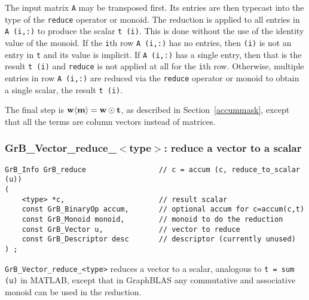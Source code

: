 \documentclass[12pt]{article}
\begin{document}
The input matrix \verb'A' may be transposed first.  Its entries are then
typecast into the type of the \verb'reduce' operator or monoid.  The reduction
is applied to all entries in \verb'A (i,:)' to produce the scalar \verb't (i)'.
This is done without the use of the identity value of the monoid.  If the
\verb'i'th row \verb'A (i,:)' has no entries, then \verb'(i)' is not an entry
in \verb't' and its value is implicit.  If \verb'A (i,:)' has a single entry,
then that is the result \verb't (i)' and \verb'reduce' is not applied at all
for the \verb'i'th row.  Otherwise, multiple entries in row \verb'A (i,:)' are
reduced via the \verb'reduce' operator or monoid to obtain a single scalar,
the result \verb't (i)'.

The final step is ${\bf w \langle m \rangle  = w \odot t}$, as described
in Section~\ref{accummask}, except that all the
terms are column vectors instead of matrices.

\newpage
\subsubsection{{\sf GrB\_Vector\_reduce\_$<$type$>$:} reduce a vector to a scalar}
\label{reduce_vector_to_scalar}

\begin{mdframed}[userdefinedwidth=6in]
{\footnotesize
\begin{verbatim}
GrB_Info GrB_reduce                 // c = accum (c, reduce_to_scalar (u))
(
    <type> *c,                      // result scalar
    const GrB_BinaryOp accum,       // optional accum for c=accum(c,t)
    const GrB_Monoid monoid,        // monoid to do the reduction
    const GrB_Vector u,             // vector to reduce
    const GrB_Descriptor desc       // descriptor (currently unused)
) ;
\end{verbatim} } \end{mdframed}

\verb'GrB_Vector_reduce_<type>'
reduces a vector to a scalar, analogous to \verb't = sum (u)' in MATLAB,
except that in GraphBLAS any commutative and associative monoid can be used
in the reduction.

\end{document}
